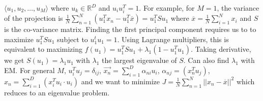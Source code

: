 $\langle u_1 , u_2, \ldots , u_M \rangle$ where $u_k \in {\mathbb R}^D$
and $u_i u_i^T =1$.  For example, for $M=1$, the
variance of the projection is
${\frac 1 N} \sum_{n=1}^N (u_1^T x_n -u_1^T {\overline x})= u_1^T S u_1$ where
${\overline x} = {\frac 1 N} \sum_{i=1}^N x_i$ and $S$ is the co-variance matrix.  
Finding the first principal component requires us to
to maximize $u_1^T S u_1$ subject to  $u_1^t u_1 =1$.  Using Lagrange multipliers,
this is equivalent to maximizing $f(u_1)= u_1^T S u_1 + \lambda_1 (1- u_1^T u_1)$.  Taking
derivative, we get $S(u_1) = \lambda_1 u_1$ with $\lambda_1$ the largest eigenvalue
of $S$.  Can also find $\lambda_1$ with EM.  For general $M$,
$u_i^T u_j= \delta_{ij}$, ${\vec {x_n}}= \sum_{i=1}^D \alpha_{ni} u_i$,
$\alpha_{nj}= (x_n^T u_j)$, 
$x_n= \sum_{i=1}^D (x_i^Tu_i \cdot u_i)$ and
we want to minimize $J= {\frac 1 N} \sum_{n=1}^N ||x_n-{\overline x}||^2$
which reduces to an eigenvalue problem.
